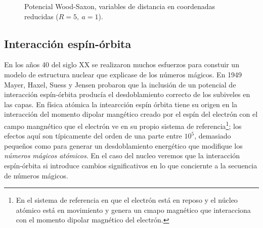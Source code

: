 \begin{figure}[h!] \centering
	\caption{Potencial Wood-Saxon, variables de distancia en coordenadas reducidas ($R = 5, \ a = 1$).}	
	\label{Fig:04-02}
\end{figure}

\subsection{Interacción espín-órbita}

En los años 40 del siglo XX se realizaron muchos esfuerzos para constuir un modelo de estructura nuclear que explicase de los números mágicos. En 1949 Mayer, Haxel, Suess y Jensen probaron que la inclusión de un potencial de interacción espín-órbita producía el desdoblamiento correcto de los subiveles en las capas. En física atómica la intearcción espín órbita tiene su origen en la interacción del momento dipolar mangético creado por el espín del electrón con el campo mangnético que el electrón ve en su propio sistema de referencia\footnote{En el sistema de referencia en que el electrón está en reposo y el núcleo atómico está en movimiento y genera un cmapo magnético que interacciona con el momento dipolar magnético del electrón.}; los efectos aquí son típicamente del orden de una parte entre $10^5$, demasiado pequeños como para generar un desdoblamiento energético que modifique los \textit{números mágicos atómicos}. En el caso del nucleo veremos que la interacción espín-órbita si introduce cambios significativos en lo que conciernte a la secuencia de números mágicos. 

